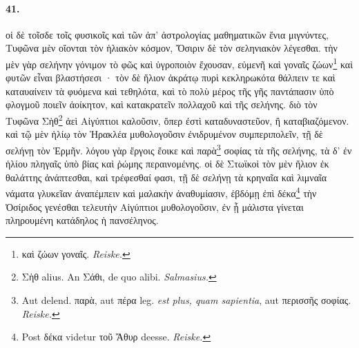 \documentclass[a4paper, 11pt, oneside, polutonikogreek, german]{article}
\begin{document}
\paragraph{41.}
οἱ δὲ τοῖσδε τοῖς φυσικοῖς καὶ τῶν ἀπ' ἀστρολογίας μαθηματικῶν ἔνια μιγνύντες, Τυφῶνα μὲν οἴονται τὸν ἡλιακὸν κόσμον, Ὄσιριν δὲ τὸν σεληνιακὸν λέγεσθαι. τὴν μὲν γὰρ σελήνην γόνιμον τὸ φῶς καὶ ὑγροποιὸν ἔχουσαν, εὐμενῆ καὶ γοναῖς ζώων\footnote{καὶ ζώων γοναῖς. \emph{Reiske.}} καὶ φυτῶν εἶναι βλαστήσεσι · τὸν δὲ ἥλιον ἀκράτῳ πυρὶ κεκληρωκότα θάλπειν τε καὶ καταυαίνειν τὰ φυόμενα καὶ τεθηλότα, καὶ τὸ πολὺ μέρος τῆς γῆς παντάπασιν ὑπὸ φλογμοῦ ποιεῖν ἀοίκητον, καὶ κατακρατεῖν πολλαχοῦ καὶ τῆς σελήνης. διὸ τὸν Τυφῶνα Σὴθ\footnote{Σὴθ alius. An Σάθι, de quo alibi. \emph{Salmasius.}} ἀεὶ Αἰγύπτιοι καλοῦσιν, ὅπερ ἐστὶ καταδυναστεῦον, ἢ καταβιαζόμενον. καὶ τῷ μὲν ἡλίῳ τὸν Ἡρακλέα μυθολογοῦσιν ἐνιδρυμένον συμπεριπολεῖν, τῇ δὲ σελήνῃ τὸν Ἑρμῆν. λόγου γὰρ ἔργοις ἔοικε καὶ παρὰ\footnote{Aut delend. παρὰ, aut πέρα leg. \emph{est plus, quam sapientia}, aut περισσῆς σοφίας. \emph{Reiske.}} σοφίας τὰ τῆς σελήνης, τὰ δ' ἐν ἡλίου πληγαῖς ὑπὸ βίας καὶ ῥώμης περαινομένης. οἱ δὲ Στωϊκοὶ τὸν μὲν ἥλιον ἐκ θαλάττης ἀνάπτεσθαι, καὶ τρέφεσθαί φασι, τῇ δὲ σελήνῃ τὰ κρηναῖα καὶ λιμναῖα νάματα γλυκεῖαν ἀναπέμπειν καὶ μαλακὴν ἀναθυμίασιν, ἑβδόμῃ ἐπὶ δέκα\footnote{Post δέκα videtur τοῦ Ἄθυρ deesse. \emph{Reiske.}} τὴν Ὀσίριδος γενέσθαι τελευτὴν Αἰγύπτιοι μυθολογοῦσιν, ἐν ᾗ μάλιστα γίνεται πληρουμένη κατάδηλος ἡ πανσέληνος.
\end{document}
